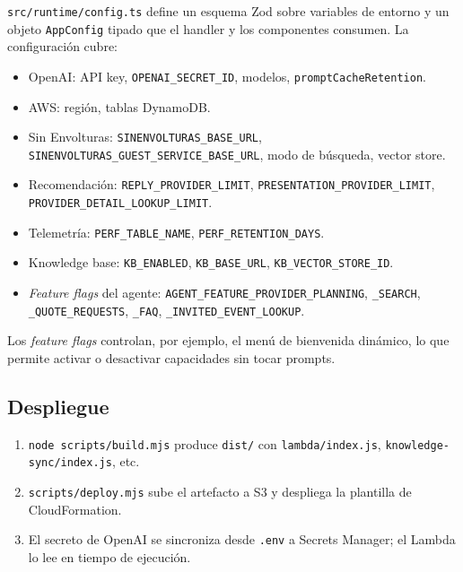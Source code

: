 \documentclass[11pt,a4paper]{article}
\begin{document}
\texttt{src/runtime/config.ts} define un esquema Zod sobre variables
de entorno y un objeto \texttt{AppConfig} tipado que el handler y los
componentes consumen. La configuración cubre:

\begin{itemize}[leftmargin=*,itemsep=1pt]
  \item OpenAI: API key, \texttt{OPENAI\_SECRET\_ID}, modelos,
        \texttt{promptCacheRetention}.
  \item AWS: región, tablas DynamoDB.
  \item Sin Envolturas: \texttt{SINENVOLTURAS\_BASE\_URL},
        \texttt{SINENVOLTURAS\_GUEST\_SERVICE\_BASE\_URL}, modo de
        búsqueda, vector store.
  \item Recomendación: \texttt{REPLY\_PROVIDER\_LIMIT},
        \texttt{PRESENTATION\_PROVIDER\_LIMIT},
        \texttt{PROVIDER\_DETAIL\_LOOKUP\_LIMIT}.
  \item Telemetría: \texttt{PERF\_TABLE\_NAME},
        \texttt{PERF\_RETENTION\_DAYS}.
  \item Knowledge base: \texttt{KB\_ENABLED},
        \texttt{KB\_BASE\_URL}, \texttt{KB\_VECTOR\_STORE\_ID}.
  \item \emph{Feature flags} del agente:
        \texttt{AGENT\_FEATURE\_PROVIDER\_PLANNING},
        \texttt{\_SEARCH}, \texttt{\_QUOTE\_REQUESTS},
        \texttt{\_FAQ}, \texttt{\_INVITED\_EVENT\_LOOKUP}.
\end{itemize}

Los \emph{feature flags} controlan, por ejemplo, el menú de bienvenida
dinámico, lo que permite activar o desactivar capacidades sin tocar
prompts.

\subsection{Despliegue}

\begin{enumerate}[leftmargin=*,itemsep=1pt]
  \item \texttt{node scripts/build.mjs} produce \texttt{dist/}
        con \texttt{lambda/index.js},
        \texttt{knowledge-sync/index.js}, etc.
  \item \texttt{scripts/deploy.mjs} sube el artefacto a S3 y
        despliega la plantilla de CloudFormation.
  \item El secreto de OpenAI se sincroniza desde \texttt{.env} a
        Secrets Manager; el Lambda lo lee en tiempo de ejecución.
\end{enumerate}
\end{document}
